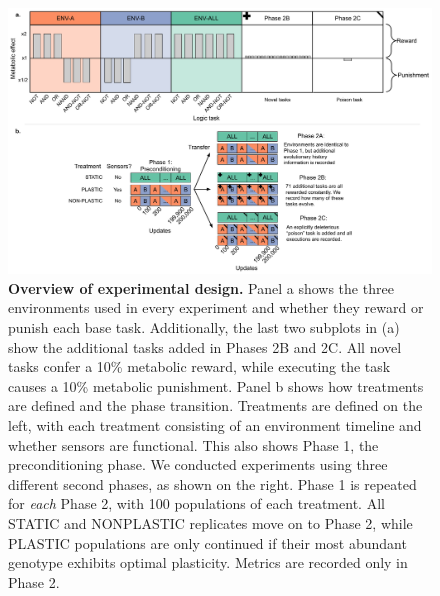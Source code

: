 \begin{figure}[h!]
    \centering
    \includegraphics[width=1\textwidth]{media/experimental-design.pdf}
    \caption{\small
    \textbf{Overview of experimental design.}
    Panel a shows the three environments used in every experiment and whether they reward or punish each base task. 
    Additionally, the last two subplots in (a) show the additional tasks added in Phases 2B and 2C. 
    All novel tasks confer a 10\% metabolic reward, while executing the  task causes a 10\% metabolic punishment. 
    Panel b shows how treatments are defined and the phase transition. 
    Treatments are defined on the left, with each treatment consisting of an environment timeline and whether sensors are functional. 
    This also shows Phase 1, the preconditioning phase.  
    We conducted experiments using three different second phases, as shown on the right. 
    Phase 1 is repeated for \textit{each} Phase 2, with 100 populations of each treatment. 
    All STATIC and NONPLASTIC replicates move on to Phase 2, while PLASTIC populations are only continued if their most abundant genotype exhibits optimal plasticity. 
    Metrics are recorded only in Phase 2. 
    }
    \label{fig:experimental-design}
\end{figure}